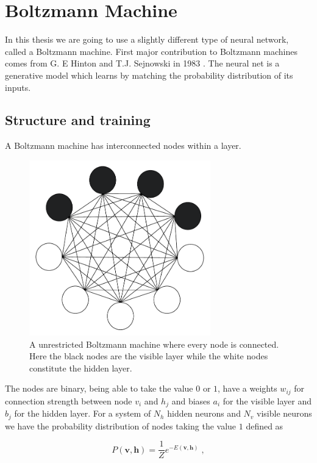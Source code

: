 \section{Boltzmann Machine}
In this thesis we are going to use a slightly different type of neural network, called a Boltzmann machine. First major contribution to Boltzmann machines comes from G. E Hinton and T.J. Sejnowski in 1983 \cite{ancoopcomp}. The neural net is a generative model which learns by matching the probability distribution of its inputs. 

\subsection{Structure and training}

A Boltzmann machine has interconnected nodes within a layer.

\begin{figure}[H]
    \centering
    \includegraphics[width=0.7\textwidth]{Figures/Drawn/machinelearning/boltzmann1.pdf}
    \caption{A unrestricted Boltzmann machine where every node is connected. Here the black nodes are the visible layer while the white nodes constitute the hidden layer. }
    \label{fig:boltz1}
\end{figure}

The nodes are binary, being able to take the value $0$ or $1$, have a weights $w_{ij}$ for connection strength between node $v_i$ and $h_j$ and biases $a_i$ for the visible layer and $b_j$ for the hidden layer. For a system of $N_h$ hidden neurons and $N_v$ visible neurons we have the probability distribution of nodes taking the value $1$ defined as

\begin{equation}
    P(\boldsymbol{v},\boldsymbol{h}) = \frac{1}{Z} e^{-E(\boldsymbol{v},\boldsymbol{h})} \; ,
\end{equation}

